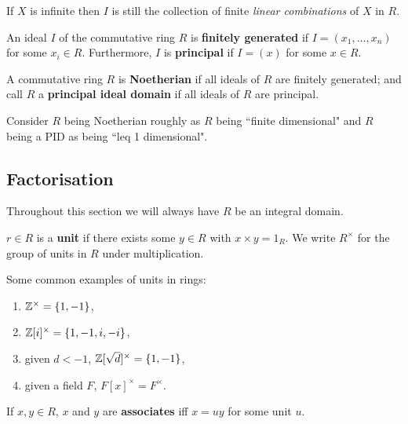\documentclass{report}
\begin{document}
\begin{remark}
    If $X$ is infinite then $I$ is still the collection of finite \textit{linear combinations} of $X$ in $R$.
\end{remark}

\begin{definition}
    An ideal $I$ of the commutative ring $R$ is \textbf{finitely generated} if $I=(x_1,\ldots,x_n)$ for some $x_i\in R$. Furthermore, $I$ is \textbf{principal} if $I=(x)$ for some $x\in R$.
\end{definition}

\begin{definition}
    A commutative ring $R$ is \textbf{Noetherian} if all ideals of $R$ are finitely generated; and call $R$ a \textbf{principal ideal domain} if all ideals of $R$ are principal.
\end{definition}

\begin{remark}
    Consider $R$ being Noetherian roughly as $R$ being ``finite dimensional" and $R$ being a PID as being ``leq 1 dimensional".
\end{remark}

\subsection{Factorisation}
Throughout this section we will always have $R$ be an integral domain.

\begin{definition}[Unit]
    $r\in R$ is a \textbf{unit} if there exists some $y\in R$ with $x\times y=1_R$. We write  $R^\times$ for the group of units in $R$ under multiplication.
\end{definition}

\begin{examples}
    Some common examples of units in rings: \begin{enumerate}
        \item $\mathbb{Z}^\times = \{1,-1\}$,
        \item $\mathbb{Z}[i]^\times=\{1,-1,i,-i\}$,
        \item given $d<-1$, $\mathbb{Z}[\sqrt{d}]^\times=\{1,-1\}$,
        \item given a field $F$, $F[x]^\times=F^\times$.
    \end{enumerate}
\end{examples}

\begin{definition}[Associates]
    If $x,y\in R$, $x$ and $y$ are \textbf{associates} iff $x=uy$ for some unit $u$.
\end{definition}
\end{document}

